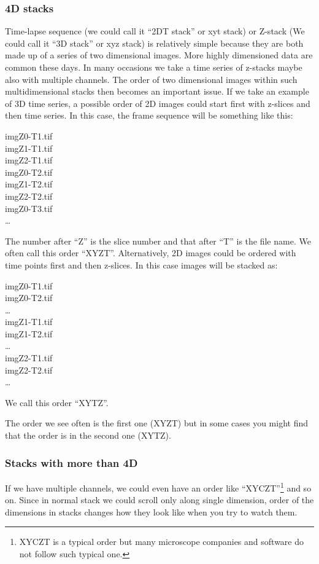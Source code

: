\subsubsection{4D stacks}

Time-lapse sequence (we could call it ``2DT stack'' or xyt stack) or Z-stack (We could call it ``3D stack'' or xyz stack) is relatively simple because they are both made up of a series of two dimensional images. More highly dimensioned data are common these days. In many occasions we take a time series of z-stacks maybe also with multiple channels. The order of two dimensional images within such multidimensional stacks then becomes an important issue. If we take an example of 3D time series, a possible order of 2D images could start first with z-slices and then time series. In this case, the frame sequence will be something like this:

imgZ0-T1.tif\\
imgZ1-T1.tif\\
imgZ2-T1.tif\\
imgZ0-T2.tif\\
imgZ1-T2.tif\\
imgZ2-T2.tif\\
imgZ0-T3.tif\\
\ldots

The number after ``Z'' is the slice number and that after ``T'' is the file name. We often call this order ``XYZT''. Alternatively, 2D images could be ordered with time points first and then z-slices. In this case images will be stacked as:

imgZ0-T1.tif\\
imgZ0-T2.tif\\
\ldots\\
imgZ1-T1.tif\\
imgZ1-T2.tif\\
\ldots\\
imgZ2-T1.tif\\
imgZ2-T2.tif\\
\ldots

We call this order ``XYTZ''. 

The order we see often is the first one (XYZT) but in some
cases you might find that the order is in the second one (XYTZ). 

\subsubsection{Stacks with more than 4D}

If we have multiple channels, we could even have an order like ``XYCZT''\footnote{XYCZT is a typical order but many microscope companies and software do not follow such typical one.} and so on. Since in normal stack we could scroll only along single dimension, order of the dimensions in stacks changes how they look like when you try to watch them. 

